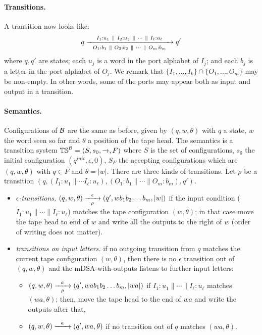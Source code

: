 \paragraph*{Transitions.} A transition now looks like:
\begin{align*}
q \xrightarrow[~~O_1: b_1 ~\parallel~ O_2: b_2 ~\parallel~ \cdots ~\parallel~ O_m: b_m~~]{I_1: u_1 ~\parallel~ I_2: u_2 ~\parallel~ \cdots ~\parallel~ I_\ell: u_\ell} q'
\end{align*}
where $q, q'$ are states; each $u_j$ is a word in the port alphabet of $I_j$; and each $b_j$ is a letter in the port alphabet of $O_j$. We remark that $\{I_1, \dots, I_k\} \cap \{O_1, \dots, O_m\}$ may be non-empty. In other words, some of the ports may appear both as input and output in a transition.  

\paragraph*{Semantics.} Configurations of $\mathcal{B}$ are the same as before, given by $(q, w, \theta)$ with $q$ a state, $w$ the word seen so far and $\theta$ a position of the tape head. The semantics is a transition system $\mathbb{TS}^{\mathcal{B}} = (S, s_0, \xrightarrow{}, F)$ where $S$ is the set of configurations, $s_0$ the initial configuration $(q^{init}, \epsilon, 0)$, $S_F$ the accepting configurations which are $(q, w, \theta)$ with $q \in F$ and $\theta = |w|$. There are three kinds of transitions. Let $\rho$ be a transition $(q, (I_1: u_1 \parallel \cdots I_\ell:u_\ell), (O_1: b_1 \parallel \cdots \parallel O_m: b_m), q')$.
\begin{itemize}
\item \emph{$\epsilon$-transitions.} $(q, w, \theta) \xrightarrow[\rho]{~~\epsilon~~} (q', wb_1 b_2 \dots b_m, |w|)$ if the input condition ($I_1:u_1 \parallel \cdots \parallel I_\ell:u_\ell$) matches the tape configuration $(w, \theta)$; in that case move the tape head to end of $w$ and write all the outputs to the right of $w$ (order of writing does not matter).
\item \emph{transitions on input letters.} if no outgoing transition from $q$ matches the current tape configuration $(w, \theta)$, then there is no $\epsilon$ transition out of $(q, w, \theta)$ and the mDSA-with-outputs listens to further input letters: 
\begin{itemize}
\item $(q, w, \theta) \xrightarrow[\rho]{~~a~~} (q', wab_1 b_2 \dots b_m, |wa|)$ if $I_1:u_1 \parallel \cdots \parallel I_\ell:u_\ell$ matches $(wa, \theta)$; then, move the tape head to the end of $wa$ and write the outputs after that,
\item $(q, w, \theta) \xrightarrow{~~a~~} (q', wa, \theta)$ if no transition out of $q$ matches $(wa, \theta)$.
\end{itemize}
\end{itemize} 
